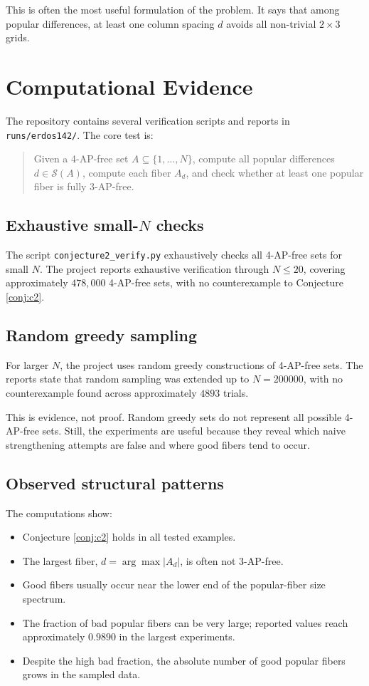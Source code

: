\documentclass[11pt]{article}
\newcommand{\calS}{\mathcal{S}}
\begin{document}
This is often the most useful formulation of the problem.  It says that among
popular differences, at least one column spacing \(d\) avoids all non-trivial
\(2\times3\) grids.

\section{Computational Evidence}

The repository contains several verification scripts and reports in
\texttt{runs/erdos142/}.  The core test is:

\begin{quote}
Given a 4-AP-free set \(A\subseteq\{1,\ldots,N\}\), compute all popular
differences \(d\in\calS(A)\), compute each fiber \(A_d\), and check whether at
least one popular fiber is fully 3-AP-free.
\end{quote}

\subsection{Exhaustive small-\(N\) checks}

The script \texttt{conjecture2\_verify.py} exhaustively checks all 4-AP-free
sets for small \(N\).  The project reports exhaustive verification through
\(N\leq 20\), covering approximately \(478{,}000\) 4-AP-free sets, with no
counterexample to Conjecture \ref{conj:c2}.

\subsection{Random greedy sampling}

For larger \(N\), the project uses random greedy constructions of 4-AP-free sets.
The reports state that random sampling was extended up to \(N=200000\), with no
counterexample found across approximately \(4893\) trials.

This is evidence, not proof.  Random greedy sets do not represent all possible
4-AP-free sets.  Still, the experiments are useful because they reveal which
naive strengthening attempts are false and where good fibers tend to occur.

\subsection{Observed structural patterns}

The computations show:
\begin{itemize}
  \item Conjecture \ref{conj:c2} holds in all tested examples.
  \item The largest fiber, \(d=\arg\max |A_d|\), is often not 3-AP-free.
  \item Good fibers usually occur near the lower end of the popular-fiber size
  spectrum.
  \item The fraction of bad popular fibers can be very large; reported values
  reach approximately \(0.9890\) in the largest experiments.
  \item Despite the high bad fraction, the absolute number of good popular
  fibers grows in the sampled data.
\end{itemize}
\end{document}
